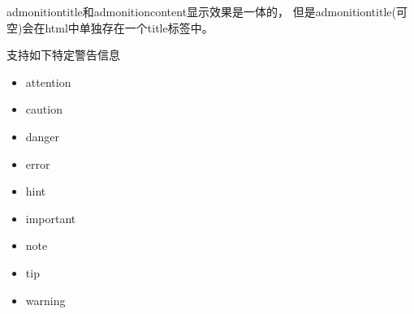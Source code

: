 \documentclass[a4paper,10pt,english]{sphinxmanual}
\begin{document}
\begin{sphinxVerbatim}[commandchars=\\\{\}]
  
    
        
\end{sphinxVerbatim}

\sphinxAtStartPar
admonition\sphinxhyphen{}title和admonition\sphinxhyphen{}content显示效果是一体的，
但是admonition\sphinxhyphen{}title(可空)会在html中单独存在一个title标签中。

\sphinxAtStartPar
支持如下特定警告信息
\begin{itemize}
\item {} 
\sphinxAtStartPar
attention

\item {} 
\sphinxAtStartPar
caution

\item {} 
\sphinxAtStartPar
danger

\item {} 
\sphinxAtStartPar
error

\item {} 
\sphinxAtStartPar
hint

\item {} 
\sphinxAtStartPar
important

\item {} 
\sphinxAtStartPar
note

\item {} 
\sphinxAtStartPar
tip

\item {} 
\sphinxAtStartPar
warning

\end{itemize}

\sphinxAtStartPar
{}
\end{document}
